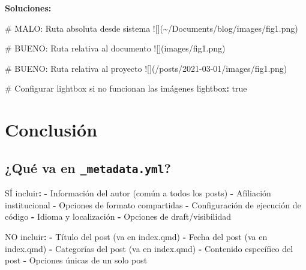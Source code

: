 \documentclass[
  doc,
  floatsintext,
  longtable,
  a4paper,
  nolmodern,
  notxfonts,
  notimes,
  12pt,
  colorlinks=true,linkcolor=blue,citecolor=blue,urlcolor=blue]{apa7}
\newenvironment{Shaded}{\begin{snugshade}}{\end{snugshade}}
\newcommand{\AlertTok}[1]{\textcolor[rgb]{0.68,0.00,0.00}{#1}}
\newcommand{\AttributeTok}[1]{\textcolor[rgb]{0.40,0.45,0.13}{#1}}
\newcommand{\CharTok}[1]{\textcolor[rgb]{0.13,0.47,0.30}{#1}}
\newcommand{\CommentTok}[1]{\textcolor[rgb]{0.37,0.37,0.37}{#1}}
\newcommand{\FunctionTok}[1]{\textcolor[rgb]{0.28,0.35,0.67}{#1}}
\newcommand{\KeywordTok}[1]{\textcolor[rgb]{0.00,0.23,0.31}{\textbf{#1}}}
\begin{document}
\textbf{Soluciones:}

\begin{Shaded}
\begin{Highlighting}[]
\FunctionTok{\#  MALO: Ruta absoluta desde sistema}
\AlertTok{![](\textasciitilde{}/Documents/blog/images/fig1.png)}

\FunctionTok{\# BUENO: Ruta relativa al documento}
\AlertTok{![](images/fig1.png)}

\FunctionTok{\# BUENO: Ruta relativa al proyecto}
\AlertTok{![](/posts/2021{-}03{-}01/images/fig1.png)}
\end{Highlighting}
\end{Shaded}

\begin{Shaded}
\begin{Highlighting}[]
\CommentTok{\# Configurar lightbox si no funcionan las imágenes}
\FunctionTok{lightbox}\KeywordTok{:}\AttributeTok{ }\CharTok{true}
\end{Highlighting}
\end{Shaded}

\section{Conclusión}\label{conclusiuxf3n}

\subsection{\texorpdfstring{¿Qué va en
\texttt{\_metadata.yml}?}{¿Qué va en \_metadata.yml?}}\label{quuxe9-va-en-_metadata.yml}

\begin{Shaded}
\begin{Highlighting}[]
\FunctionTok{SÍ incluir}\KeywordTok{:}
\KeywordTok{{-}}\AttributeTok{ Información del autor (común a todos los posts)}
\KeywordTok{{-}}\AttributeTok{ Afiliación institucional}
\KeywordTok{{-}}\AttributeTok{ Opciones de formato compartidas}
\KeywordTok{{-}}\AttributeTok{ Configuración de ejecución de código}
\KeywordTok{{-}}\AttributeTok{ Idioma y localización}
\KeywordTok{{-}}\AttributeTok{ Opciones de draft/visibilidad}

\AttributeTok{ }\FunctionTok{NO incluir}\KeywordTok{:}
\KeywordTok{{-}}\AttributeTok{ Título del post (va en index.qmd)}
\KeywordTok{{-}}\AttributeTok{ Fecha del post (va en index.qmd)}
\KeywordTok{{-}}\AttributeTok{ Categorías del post (va en index.qmd)}
\KeywordTok{{-}}\AttributeTok{ Contenido específico del post}
\KeywordTok{{-}}\AttributeTok{ Opciones únicas de un solo post}
\end{Highlighting}
\end{Shaded}
\end{document}
